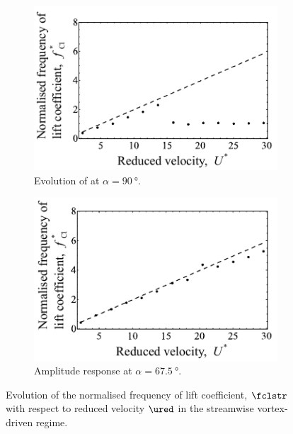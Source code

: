 \documentclass[a4paper,fleqn]{cas-sc}
\begin{document}
\begin{figure}
  \centering
  \begin{subfigure}[h]{0.38\textwidth}
    \includegraphics[width=\textwidth]{figs/clFreq5}
    \caption{Evolution of at $\alpha = \SI{90}{\degree}$.}
    \label{fig:clFreq5}
  \end{subfigure}

  \begin{subfigure}[h]{0.38\textwidth}
    \includegraphics[width=\textwidth]{figs/clFreq4}
    \caption{Amplitude response at $\alpha = \SI{67.5}{\degree}$.}
    \label{fig:clFreq4}
  \end{subfigure}
  \caption{Evolution of the normalised frequency of lift coefficient, $\fclstr$ with respect to reduced velocity $\ured$ in the streamwise vortex-driven regime.} \label{fig:yStrRMSStreamwise}
\end{figure}
\end{document}
